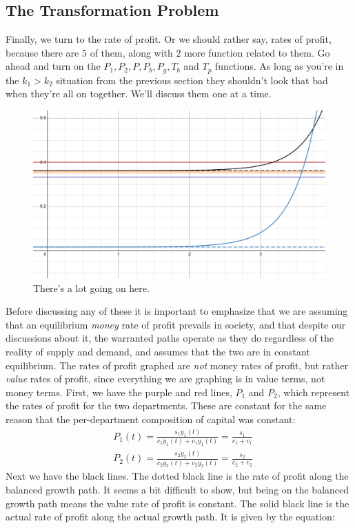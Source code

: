 \documentclass{article}
\theoremstyle{theorem}
\begin{document}
\subsection{The Transformation Problem}
Finally, we turn to the rate of profit. Or we should rather say, rates of profit, because there are $5$ of them, along with $2$ more function related to them. Go ahead and turn on the $P_1,P_2,P,P_b,P_g,T_b$ and $T_p$ functions. As long as you're in the $k_1 > k_2$ situation from the previous section they shouldn't look that bad when they're all on together. We'll discuss them one at a time. 
\begin{figure}[H]
\centering
\includegraphics[scale=.5]{Images/ratesOfProfit}
\caption{There's a lot going on here.}
\end{figure} 
Before discussing any of these it is important to emphasize that we are assuming that an equilibrium \emph{money} rate of profit prevails in society, and that despite our discussions about it, the warranted paths operate as they do regardless of the reality of supply and demand, and assumes that the two are in constant equilibrium. The rates of profit graphed are \emph{not} money rates of profit, but rather \emph{value} rates of profit, since everything we are graphing is in value terms, not money terms. First, we have the purple and red lines, $P_1$ and $P_2$, which represent the rates of profit for the two departments. These are constant for the same reason that the per-department composition of capital was constant: 
\begin{align}
	& P_1(t) = \frac{s_1y_1(t)}{c_1y_1(t)+v_1y_1(t)} = \frac{s_1}{c_1+v_1} \\
	& P_2(t) = \frac{s_2y_2(t)}{c_2y_2(t)+v_2y_2(t)} = \frac{s_2}{c_2+v_2} 
\end{align} 
Next we have the black lines. The dotted black line is the rate of profit along the balanced growth path. It seems a bit difficult to show, but being on the balanced growth path means the value rate of profit is constant. The solid black line is the actual rate of profit along the actual growth path. It is given by the equation:
\end{document}
